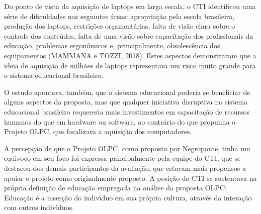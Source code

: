 \documentclass[
12pt,		%
openright,	%
twoside,  %
a4paper,			%
chapter=TITLE,		%
english,			%
french,				%
spanish,			%
brazil				%
]{USPSC-classe/USPSC}
\begin{document}
Do ponto de vista da aquisi\c{c}\~ao de \textquotedbl laptops \textquotedbl  em larga escala, o CTI identificou uma s\'erie de dificuldades nas seguintes \'areas: apropria\c{c}\~ao pela escola brasileira, produ\c{c}\~ao dos laptops, restri\c{c}\~oes or\c{c}ament\'arias, falta de vis\~ao clara sobre o controle dos conte\'udos, falta de uma vis\~ao sobre capacita\c{c}\~ao dos profissionais da educa\c{c}\~ao, problemas ergon\^omicos e, principalmente, obsolesc\^encia dos equipamentos (MAMMANA e TOZZI, 2018). Estes aspectos demonstraram que a ideia de aquisi\c{c}\~ao de milh\~oes de laptops representava um risco muito grande para o sistema educacional brasileiro.

















O estudo apontava, tamb\'em, que o sistema educacional poderia se beneficiar de alguns aspectos da proposta, mas que qualquer iniciativa disruptiva no sistema educacional brasileiro requereria mais investimentos em capacita\c{c}\~ao de recursos humanos do que em hardware ou software, ao contr\'ario do que propunha o Projeto OLPC, que focalizava a aquisi\c{c}\~ao dos computadores.

















A percep\c{c}\~ao de que o Projeto OLPC, como proposto por Negroponte, tinha um equ\'{\i}voco em seu foco foi expressa principalmente pela equipe do CTI, que se destacou dos demais participantes da avalia\c{c}\~ao, que estavam mais propensos a apoiar o projeto como originalmente proposto. A posi\c{c}\~ao do CTI se sustentava na pr\'opria defini\c{c}\~ao de educa\c{c}\~ao empregada na an\'alise da proposta OLPC: \textquotedbl Educa\c{c}\~ao \'e a inser\c{c}\~ao do indiv\'{\i}duo em sua pr\'opria cultura, atrav\'es da intera\c{c}\~ao com outros indiv\'{\i}duos\textquotedbl .
\end{document}
